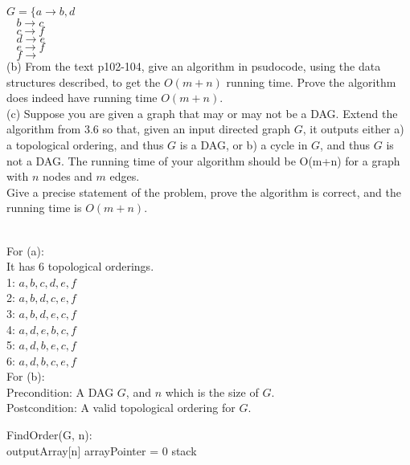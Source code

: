 \documentclass{assignment}
\begin{document}
\begin{problemlist}
\begin{problem}
$G=\{a\rightarrow b,d$\\
$~~~~b\rightarrow c$\\
$~~~~c\rightarrow f$\\
$~~~~d\rightarrow e$\\
$~~~~e\rightarrow f$\\
$~~~~f\rightarrow$\\
(b) From the text p102-104, give an algorithm in psudocode, using the data structures described, to get the $O(m+n)$ running time. Prove the algorithm does indeed have running time $O(m+n)$.\\
(c) Suppose you are given a graph that may or may not be a DAG. Extend the algorithm from 3.6 so that, given an input directed graph $G$, it outputs either a) a topological ordering, and thus $G$ is a DAG, or b) a cycle in $G$, and thus $G$ is not a DAG. The running time of your algorithm should be O(m+n) for a graph with $n$ nodes and $m$ edges.\\
Give a precise statement of the problem, prove the algorithm is correct, and the running time is $O(m+n)$.\\
\end{problem}
\begin{answer}
\\
For (a):\\
It has 6 topological orderings.\\
1: $a,b,c,d,e,f$\\
2: $a,b,d,c,e,f$\\
3: $a,b,d,e,c,f$\\
4: $a,d,e,b,c,f$\\
5: $a,d,b,e,c,f$\\
6: $a,d,b,c,e,f$\\
\clearpage
For (b):\\
Precondition: A DAG $G$, and $n$ which is the size of $G$.\\
Postcondition: A valid topological ordering for $G$.\\
\begin{algorithm}
  FindOrder(G, n):{\\
    outputArray[n]\;
    arrayPointer = 0\;
    stack\;
    }
\end{algorithm}
\end{answer}
\end{problemlist}
\end{document}
